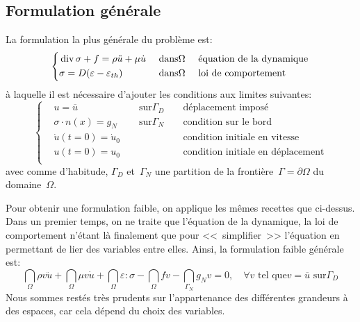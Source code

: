 \subsection{Formulation générale}
La formulation la plus générale du problème est:
\begin{equation}
\left\{
\begin{aligned}
&\operatorname{div}\sigma + f = \rho \ddot{u} + \mu \dot{u} && \text{ dans} \Omega && \text{ équation de la dynamique}\\
&\sigma=D(\varepsilon-\varepsilon_{th}) && \text{ dans} \Omega && \text{ loi de comportement}\\
\end{aligned}\right.
\end{equation}
à laquelle il est nécessaire d'ajouter les conditions aux limites suivantes:
\begin{equation}
\left\{
\begin{aligned}
&u=\overline{u} && \text{ sur} \Gamma_D && \text{ déplacement imposé}\\
&\sigma\cdot n(x)=g_N && \text{ sur} \Gamma_N && \text{ condition sur le bord}\\
&\dot{u}(t=0) = \dot{u}_0&& && \text{ condition initiale en vitesse}\\
&u(t=0) = u_0 && && \text{ condition initiale en déplacement}\\
\end{aligned}
\right.
\end{equation}
avec comme d'habitude, $\Gamma_D$ et~$\Gamma_N$ une partition de la
frontière~$\Gamma=\partial\Omega$ du domaine~$\Omega$.

\medskip
Pour obtenir une formulation faible, on applique les mêmes recettes
que ci-dessus. Dans un premier temps, on ne traite que l'équation de
la dynamique, la loi de comportement n'étant là finalement que pour
<<~simplifier~>> l'équation en permettant de lier des variables entre elles.
Ainsi, la formulation faible générale est:
\begin{equation}
\dint_\Omega \rho v\ddot{u} + \dint_\Omega \mu v\dot{u}
+\dint_\Omega \varepsilon:\sigma - \dint_\Omega fv
-\dint_{\Gamma_N} g_N v =0, \quad \forall v \text{ tel que} v=\overline{u} \text{ sur} \Gamma_D
\end{equation}
Nous sommes restés très prudents sur l'appartenance des différentes grandeurs
à des espaces, car cela dépend du choix des variables.

